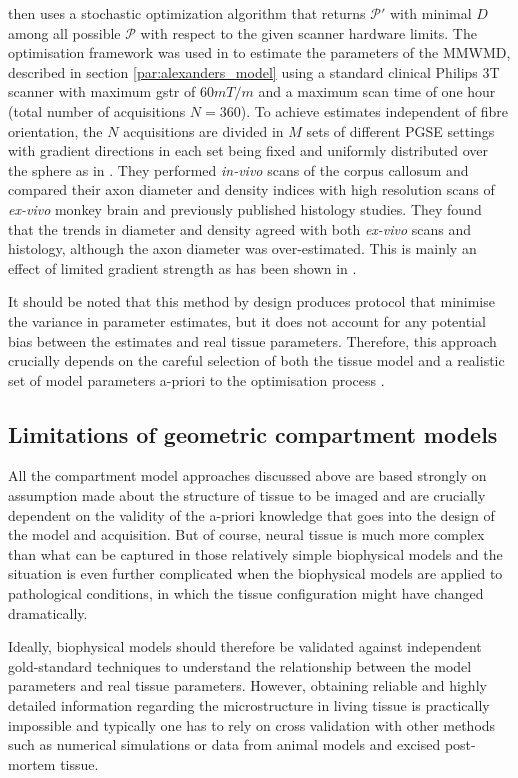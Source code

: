 \citet{Alexander:2008} then uses a stochastic optimization algorithm \citep{Zelinka:2010} that returns $\mathcal{P}'$ with minimal $D$ among all possible $\mathcal{P}$ with respect to the given scanner hardware limits. The optimisation framework was used in \citet{Alexander:2010} to estimate the parameters of the \gls{MMWMD}, described in section \ref{par:alexanders_model} using a standard clinical Philips 3T scanner with maximum {\gls{gstr}} of $60mT/m$ and a maximum scan time of one hour (total number of acquisitions $N=360$). To achieve estimates independent of fibre orientation, the $N$ acquisitions are divided in $M$ sets of different PGSE settings with gradient directions in each set being fixed and uniformly distributed over the sphere as in \cite{Cook:2007}. They performed \emph{in-vivo} scans of the corpus callosum and compared their axon diameter and density indices with high resolution scans of \emph{ex-vivo} monkey brain and previously published histology studies. They found that the trends in diameter and density agreed with both \emph{ex-vivo} scans and histology, although the axon diameter was over-estimated. This is mainly an effect of limited gradient strength as has been shown in \cite{Dyrby:2010}. 


It should be noted that this method by design produces protocol that minimise the variance in parameter estimates, but it does not account for any potential bias between the estimates and real tissue parameters. Therefore, this approach crucially depends on the careful selection of both the tissue model and a realistic set of model parameters a-priori to the optimisation process \citep{Alexander:2008, Alexander:2010}. 

\subsection{Limitations of geometric compartment models}
All the compartment model approaches discussed above are based strongly on assumption made about the structure of tissue to be imaged and are crucially dependent on the validity of the a-priori knowledge that goes into the design of the model and acquisition. But of course, neural tissue is much more complex than what can be captured in those relatively simple biophysical models and the situation is even further complicated when the biophysical models are applied to pathological conditions, in which the tissue configuration might have changed dramatically.

Ideally, biophysical models should therefore be validated against independent gold-standard techniques to understand the relationship between the model parameters and real tissue parameters. However, obtaining reliable and highly detailed information regarding the microstructure in living tissue is practically impossible and typically one has to rely on cross validation with other methods such as numerical simulations or data from animal models and excised post-mortem tissue.


